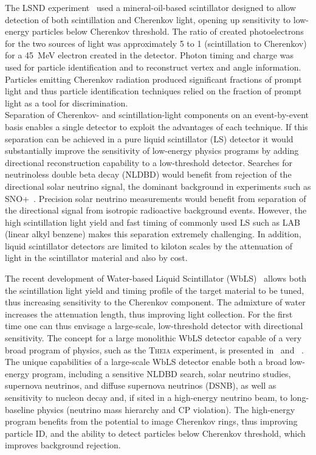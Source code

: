 The LSND experiment~\cite{lsnd} used a mineral-oil-based scintillator designed to allow detection of both scintillation and Cherenkov light, opening up  sensitivity to low-energy particles  below  Cherenkov threshold. The ratio of created photoelectrons for the two sources of light was approximately 5 to 1 (scintillation to Cherenkov) for a 45~MeV electron created in the detector. Photon timing and charge was used for particle identification and to reconstruct vertex and angle information. Particles emitting Cherenkov radiation produced significant fractions of prompt light and thus particle identification techniques relied on the fraction of prompt light as a tool for discrimination. \\
Separation of Cherenkov- and scintillation-light components on an event-by-event basis enables a single detector to exploit the advantages of each technique.  If this separation can be achieved in a pure liquid scintillator (LS) detector it would substantially improve the sensitivity of low-energy physics programs by adding directional reconstruction capability to a low-threshold detector. Searches for neutrinoless double beta decay (NLDBD) would benefit from rejection of the directional solar neutrino signal, the dominant background in experiments such as SNO+~\cite{snop}.  Precision solar neutrino measurements would benefit from  separation of the directional signal from isotropic radioactive background events. 
However, the high scintillation light yield and fast timing of commonly used LS such as LAB (linear alkyl benzene) makes this separation extremely challenging.  In addition, liquid scintillator detectors are limited to kiloton scales by the attenuation of light in the scintillator material and also by cost.

The recent development of Water-based Liquid Scintillator (WbLS)~\cite{wbls} allows both the scintillation light yield and timing profile of the target material to be tuned, thus increasing sensitivity to the Cherenkov component.  The admixture of water increases the attenuation length, thus improving light collection.  For the first time one can thus envisage a large-scale, low-threshold detector with directional sensitivity.  
The concept for a large monolithic WbLS detector capable of a very broad program of physics, such as the \textsc{Theia} experiment, is presented in~\cite{asdc} and ~\cite{theia}.  The unique capabilities of a large-scale WbLS detector enable both a broad low-energy program, including a sensitive NLDBD search, solar neutrino studies, supernova neutrinos, and diffuse supernova neutrinos (DSNB), as well as sensitivity to nucleon decay and, if sited in a high-energy neutrino beam, to long-baseline physics (neutrino mass hierarchy and CP violation).  The high-energy program benefits from the potential to image Cherenkov rings, thus improving particle ID, and the ability to detect particles below Cherenkov threshold, which improves background rejection.

